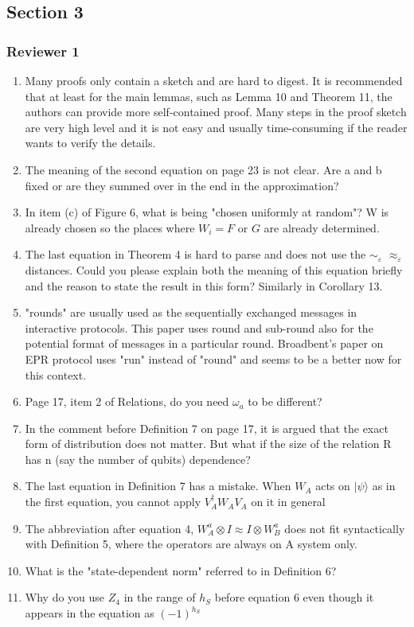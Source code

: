 \documentclass[12pt]{article}
\newcommand{\eps}{\varepsilon}
\newcommand{\ket}[1]{|#1\rangle}
\begin{document}
\subsection*{Section 3}
\subsubsection*{Reviewer 1}
\begin{enumerate}
\item Many proofs only contain a sketch and are hard to digest. It is recommended that at least for the main lemmas, such as Lemma 10 and Theorem 11, the authors can provide more self-contained proof. Many steps in the proof sketch are very high level and it is not easy and usually time-consuming if the reader wants to verify the details.
\item The meaning of the second equation on page 23 is not clear. Are a and b fixed or are they summed over in the end in the approximation?
\item In item (c) of Figure 6, what is being "chosen uniformly at random"? W is already chosen so the places where $W_i = F$ or $G$ are already determined.
\item The last equation in Theorem 4 is hard to parse and does not use the $\sim_\eps$ $\approx_\eps$ distances. Could you please explain both the meaning of this equation briefly and the reason to state the result in this form? Similarly in Corollary 13.
\item "rounds" are usually used as the sequentially exchanged messages in interactive protocols. This paper uses round and sub-round also for the potential format of messages in a particular round. Broadbent's paper on EPR protocol uses "run" instead of "round" and seems to be a better now for this context.
\item Page 17, item 2 of Relations, do you need $\omega_a$ to be different?
\item In the comment before Definition 7 on page 17, it is argued that the exact form of distribution does not matter. But what if the size of the relation R has n (say the number of qubits) dependence?
\item The last equation in Definition 7 has a mistake. When $W_A$ acts on $\ket{\psi}$ as in the first equation, you cannot apply $V^\dagger_A W_A V_A$ on it in general
\item The abbreviation after equation 4, $W^a_A \otimes I \approx I \otimes W^a_B$ does not fit syntactically with Definition 5, where the operators are always on A system only.
\item What is the "state-dependent norm" referred to in Definition 6?
\item Why do you use $Z_4$ in the range of $h_S$ before equation 6 even though it appears in the equation as $(-1)^{h_S}$
\end{enumerate}
\end{document}
